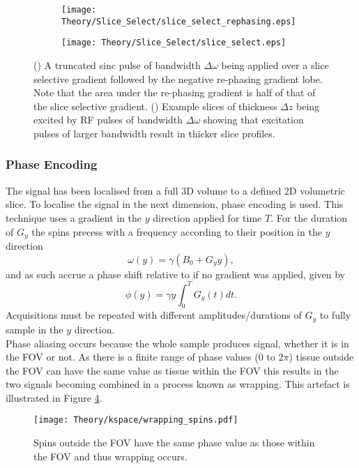 \begin{figure}[H]
	\centering
	\begin{subfigure}[c]{0.47\textwidth}
		\centering
		\texttt{[image: Theory/Slice\_Select/slice\_select\_rephasing.eps]}
		\caption{}
		\label{fig:theory_slice_select_rephasing}
	\end{subfigure}
	\hfill
	\begin{subfigure}[c]{0.47\textwidth}
		\centering
		\texttt{[image: Theory/Slice\_Select/slice\_select.eps]}
		\caption{}
		\label{fig:theory_slice_select_profile}
	\end{subfigure}
	\caption{() A truncated sinc pulse of bandwidth $\Delta \omega$ being applied over a slice selective gradient followed by the negative re-phasing gradient lobe. Note that the area under the re-phasing gradient is half of that of the slice selective gradient. () Example slices of thickness $\Delta z$ being excited by \ac{RF} pulses of bandwidth $\Delta \omega$ showing that excitation pulses of larger bandwidth result in thicker slice profiles.}
	\label{fig:theory_slice_select}
\end{figure}
\subsubsection{Phase Encoding}
The signal has been localised from a full 3D volume to a defined 2D volumetric slice. To localise the signal in the next dimension, phase encoding is used. This technique uses a gradient in the $y$ direction applied for time $T$. For the duration of $G_y$ the spins precess with a frequency according to their position in the $y$ direction
\begin{equation}
\omega \left( y\right) = \gamma\left( B_0 + G_yy\right),
\end{equation}
and as such accrue a phase shift relative to if no gradient was applied, given by 
\begin{equation}
\phi\left( y\right)  = \gamma y \int_{0}^{T} G_y\left( t\right) dt.
\end{equation}
Acquisitions must be repeated with different amplitudes/durations of $G_y$ to fully sample in the $y$ direction.\\

Phase aliasing occurs because the whole sample produces signal, whether it is in the \ac{FOV} or not. As there is a finite range of phase values ($0$ to $2\pi$) tissue outside the \ac{FOV} can have the same value as tissue within the \ac{FOV} this results in the two signals becoming combined in a process known as wrapping. This artefact is illustrated in Figure \ref{fig:theory_wrapping_spins}.
\begin{figure}[H]
	\centering
	\texttt{[image: Theory/kspace/wrapping\_spins.pdf]}
	\caption{Spins outside the \ac{FOV} have the same phase value as those within the \ac{FOV} and thus wrapping occurs.}
	\label{fig:theory_wrapping_spins}	
\end{figure}

